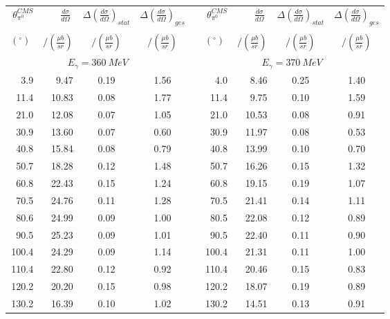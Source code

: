 \begin{table}[htbp] 
\begin{center} 
\begin{tabular}{|r|r|c|c|l|r|r|c|c|} 

\cline{1-4}
\cline{6-9} 
$\theta_{\pi^0}^{CMS}$ & 
$\displaystyle\frac{d\sigma}{d\Omega}\;$ & 
${\Delta}\left( \frac{d\sigma}{d\Omega}\right)_{stat}$ & 
${\Delta}\left( \frac{d\sigma}{d\Omega}\right)_{ges}$ & & 
$\theta_{\pi^0}^{CMS}$ & 
$\displaystyle\frac{d\sigma}{d\Omega}\;$ & 
${\Delta}\left( \frac{d\sigma}{d\Omega}\right)_{stat}$ & 
${\Delta}\left( \frac{d\sigma}{d\Omega}\right)_{ges}$ \\ 
& & & & & & & &\\ 
 $(^{\circ})\;$ & $/(\frac{{\mu}b}{sr})$ & $/(\frac{{\mu}b}{sr})$ & $/(\frac{{\mu}b}{sr})$ & & $(^{\circ})\;$ & $/(\frac{{\mu}b}{sr})$ & $/(\frac{{\mu}b}{sr})$ & $/(\frac{{\mu}b}{sr})$ \\ 
\cline{1-4} 
\cline{6-9} 
\multicolumn{4}{|c|}{ $E_{\gamma}=360~MeV$} & & 
\multicolumn{4}{c|}{ $E_{\gamma}=370~MeV$} \\ 
\cline{1-4} 
\cline{6-9} 
  3.9 &  9.47 &  0.19 &  1.56 & &   4.0 &  8.46 &  0.25 &  1.40 \\ 
 11.4 & 10.83 &  0.08 &  1.77 & &  11.4 &  9.75 &  0.10 &  1.59 \\ 
 21.0 & 12.08 &  0.07 &  1.05 & &  21.0 & 10.53 &  0.08 &  0.91 \\ 
 30.9 & 13.60 &  0.07 &  0.60 & &  30.9 & 11.97 &  0.08 &  0.53 \\ 
 40.8 & 15.84 &  0.08 &  0.79 & &  40.8 & 13.99 &  0.10 &  0.70 \\ 
 50.7 & 18.28 &  0.12 &  1.48 & &  50.7 & 16.26 &  0.15 &  1.32 \\ 
 60.8 & 22.43 &  0.15 &  1.24 & &  60.8 & 19.15 &  0.19 &  1.07 \\ 
 70.5 & 24.76 &  0.11 &  1.28 & &  70.5 & 21.41 &  0.14 &  1.11 \\ 
 80.6 & 24.99 &  0.09 &  1.00 & &  80.5 & 22.08 &  0.12 &  0.89 \\ 
 90.5 & 25.23 &  0.09 &  1.01 & &  90.5 & 22.40 &  0.11 &  0.90 \\ 
100.4 & 24.29 &  0.09 &  1.14 & & 100.4 & 21.31 &  0.11 &  1.00 \\ 
110.4 & 22.80 &  0.12 &  0.92 & & 110.4 & 20.46 &  0.15 &  0.83 \\ 
120.2 & 20.20 &  0.15 &  0.98 & & 120.2 & 18.07 &  0.19 &  0.89 \\ 
130.2 & 16.39 &  0.10 &  1.02 & & 130.2 & 14.51 &  0.13 &  0.91 \\ 

\end{tabular}
\end{center}
\end{table}
